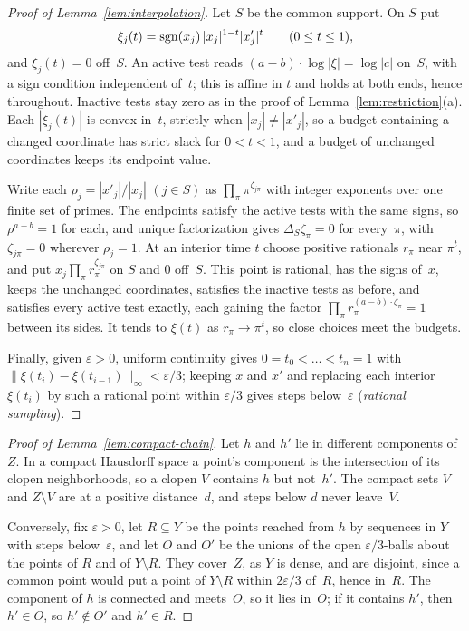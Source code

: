 \begin{proof}[Proof of Lemma~\ref{lem:interpolation}]
Let $S$ be the common support. On $S$ put
\[
  \xi_j(t)=\operatorname{sgn}(x_j)\,|x_j|^{1-t}|x'_j|^{t}\qquad(0\le t\le1),
\]
and $\xi_j(t)=0$ off~$S$. An active test reads
$(a-b)\cdot\log|\xi|=\log|c|$ on~$S$, with a sign condition independent
of~$t$; this is affine in $t$ and holds at both ends, hence throughout.
Inactive tests stay zero as in the proof of
Lemma~\ref{lem:restriction}(a). Each $|\xi_j(t)|$ is convex in~$t$,
strictly when $|x_j|\neq|x'_j|$, so a budget containing a changed
coordinate has strict slack for $0<t<1$, and a budget of unchanged
coordinates keeps its endpoint value.

Write each $\rho_j=|x'_j|/|x_j|$ $(j\in S)$ as
$\prod_\pi\pi^{\zeta_{j\pi}}$ with integer exponents over one finite set of
primes. The endpoints satisfy the active tests with the same signs, so
$\rho^{a-b}=1$ for each, and unique factorization gives
$\Delta_S\zeta_\pi=0$ for every~$\pi$, with $\zeta_{j\pi}=0$ wherever
$\rho_j=1$. At an interior time $t$ choose positive rationals $r_\pi$ near
$\pi^t$, and put $x_j\prod_\pi r_\pi^{\zeta_{j\pi}}$ on $S$ and $0$
off~$S$. This point is rational, has the signs of~$x$, keeps the unchanged
coordinates, satisfies the inactive tests as before, and satisfies every
active test exactly, each gaining the factor
$\prod_\pi r_\pi^{(a-b)\cdot\zeta_\pi}=1$ between its sides. It tends to
$\xi(t)$ as $r_\pi\to\pi^t$, so close choices meet the budgets.

Finally, given $\varepsilon>0$, uniform continuity gives
$0=t_0<\dots<t_n=1$ with
$\|\xi(t_i)-\xi(t_{i-1})\|_\infty<\varepsilon/3$; keeping $x$ and $x'$ and
replacing each interior $\xi(t_i)$ by such a rational point within
$\varepsilon/3$ gives steps below~$\varepsilon$ (\emph{rational
sampling}).
\end{proof}

\begin{proof}[Proof of Lemma~\ref{lem:compact-chain}]
Let $h$ and $h'$ lie in different components of~$Z$. In a compact
Hausdorff space a point's component is the intersection of its clopen
neighborhoods, so a clopen $V$ contains $h$ but not~$h'$. The compact sets
$V$ and $Z\setminus V$ are at a positive distance~$d$, and steps below $d$
never leave~$V$.

Conversely, fix $\varepsilon>0$, let $R\subseteq Y$ be the points reached
from $h$ by sequences in $Y$ with steps below~$\varepsilon$, and let $O$
and $O'$ be the unions of the open $\varepsilon/3$-balls about the points
of $R$ and of $Y\setminus R$. They cover~$Z$, as $Y$ is dense, and are
disjoint, since a common point would put a point of $Y\setminus R$ within
$2\varepsilon/3$ of~$R$, hence in~$R$. The component of $h$ is connected
and meets~$O$, so it lies in~$O$; if it contains $h'$, then $h'\in O$, so
$h'\notin O'$ and $h'\in R$.
\end{proof}

